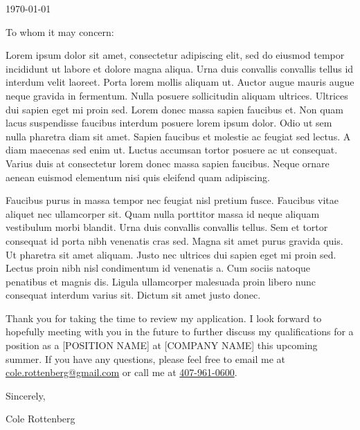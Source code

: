 \documentclass{ExpressiveCoverLetter}
\begin{document}
\coverletterheader[
    firstname=Cole,
    middleinitial=H,
    lastname=Rottenberg,
    email=cole.rottenberg@gmail.com,
    phone=407-961-0600,
    linkedin=colerottenberg,
    github=colerotteberg,
    city=Orlando,
    state=Florida,
]

\vspace{0.25in}
\today
\vspace{0.15in}


To whom it may concern:

Lorem ipsum dolor sit amet, consectetur adipiscing elit, sed do eiusmod
tempor incididunt ut labore et dolore magna aliqua. Urna duis convallis
convallis tellus id interdum velit laoreet. Porta lorem mollis aliquam
ut. Auctor augue mauris augue neque gravida in fermentum. Nulla posuere
sollicitudin aliquam ultrices. Ultrices dui sapien eget mi proin sed.
Lorem donec massa sapien faucibus et. Non quam lacus suspendisse
faucibus interdum posuere lorem ipsum dolor. Odio ut sem nulla pharetra
diam sit amet. Sapien faucibus et molestie ac feugiat sed lectus. A
diam maecenas sed enim ut. Luctus accumsan tortor posuere ac ut
consequat. Varius duis at consectetur lorem donec massa sapien
faucibus. Neque ornare aenean euismod elementum nisi quis eleifend quam
adipiscing.

Faucibus purus in massa tempor nec feugiat nisl pretium fusce. Faucibus
vitae aliquet nec ullamcorper sit. Quam nulla porttitor massa id neque
aliquam vestibulum morbi blandit. Urna duis convallis convallis tellus.
Sem et tortor consequat id porta nibh venenatis cras sed. Magna sit
amet purus gravida quis. Ut pharetra sit amet aliquam. Justo nec
ultrices dui sapien eget mi proin sed. Lectus proin nibh nisl
condimentum id venenatis a. Cum sociis natoque penatibus et magnis dis.
Ligula ullamcorper malesuada proin libero nunc consequat interdum
varius sit. Dictum sit amet justo donec.

Thank you for taking the time to review my application. I look forward
to hopefully meeting with you in the future to further discuss my
qualifications for a position as a [POSITION NAME] at [COMPANY NAME]
this upcoming summer. If you have any questions, please feel free to
email me at \href{mailto:cole.rottenberg@gmail.com}{cole.rottenberg@gmail.com} or
call me at \href{tel:+1-407-961-0600}{407-961-0600}.

Sincerely,

\vspace{.15in}

Cole Rottenberg
\end{document}
